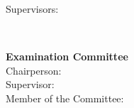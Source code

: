 \begin{titlepage}
\begin{center}
\begin{minipage}[t]{1\textwidth}
  \center
  {\large Supervisors:}\\
  {\Supervisors}
\end{minipage}\\
%
\if{}
  \vspace*{\finalAdvisorsSpacing}
\else
  \vspace*{\draftAdvisorsSpacing}
\fi
\if{}
%
\begin{minipage}[t]{1\textwidth}
  \center
  {\Large \textbf{Examination Committee}}\\
  {\large Chairperson: \Chairperson}\\
  {\large Supervisor: \MainSupervisor}\\
  {\large Member of the Committee: \CommitteeMembers}

\end{minipage}\\[1.0cm]
%
%
\fi


\end{center}
\end{titlepage}
